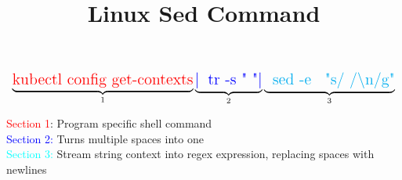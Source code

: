 \documentclass[12pt]{article}
\title{Linux Sed Command}
\begin{document}
	\[
	\Large{\underbrace{\text{\textcolor{red}{kubectl config get-contexts}}}_\text{1} \underbrace{\text{\textcolor{blue}{\textbar \: tr -s " "\textbar}}}_\text{2} \underbrace{\text{\textcolor{cyan}{\: sed -e \: "s/ /\textbackslash n/g"}}}_\text{3}}
	\]
	\begin{center}
	\textcolor{red}{Section 1}: Program specific shell command \\ \leavevmode\newline
	\textcolor{blue}{Section 2:} Turns multiple spaces into one \\ \leavevmode\newline
	\textcolor{cyan}{Section 3:} Stream string context into regex expression, replacing spaces with newlines \\
    \end{center}
\end{document}
